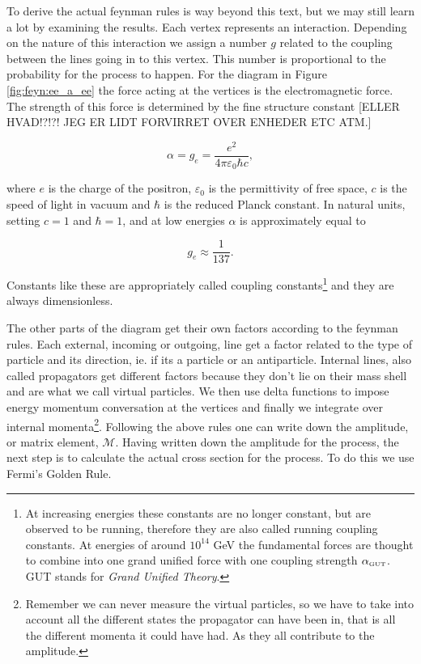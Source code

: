 To derive the actual feynman rules is way beyond this text, but we may still learn a lot by examining the results. Each vertex represents an interaction. Depending on the nature of this interaction we assign a number $g$ related to the coupling between the lines going in to this vertex. This number is proportional to the probability for the process to happen. For the diagram in Figure \ref{fig:feyn:ee_a_ee} the force acting at the vertices is the electromagnetic force. The strength of this force is determined by the fine structure constant [ELLER HVAD!?!?! JEG ER LIDT FORVIRRET OVER ENHEDER ETC ATM.]

\begin{equation}
	\alpha = g_e = \frac{e^2}{4\pi\varepsilon_0\hbar c},
\end{equation}

where $e$ is the charge of the positron, $\varepsilon_0$ is the permittivity of free space, $c$ is the speed of light in vacuum and $\hbar$ is the reduced Planck constant. In natural units, setting $c = 1$ and $\hbar = 1$, and at low energies $\alpha$ is approximately equal to

\begin{equation}
	 g_e \approx \frac{1}{137}.
\end{equation}

Constants like these are appropriately called coupling constants\footnote{At increasing energies these constants are no longer constant, but are observed to be running, therefore they are also called running coupling constants. At energies of around $10^{14}$ GeV the fundamental forces are thought to combine into one grand unified force with one coupling strength $\alpha_{\textrm{\tiny{GUT}}}$. GUT stands for \emph{Grand Unified Theory}.} and they are always dimensionless.

The other parts of the diagram get their own factors according to the feynman rules. Each external, incoming or outgoing, line get a factor related to the type of particle and its direction, ie. if its a particle or an antiparticle. Internal lines, also called propagators get different factors because they don't lie on their mass shell and are what we call virtual particles. We then use delta functions to impose energy momentum conversation at the vertices and finally we integrate over internal momenta\footnote{Remember we can never measure the virtual particles, so we have to take into account all the different states the propagator can have been in, that is all the different momenta it could have had. As they all contribute to the amplitude.}. Following the above rules one can write down the amplitude, or matrix element, $\mathcal{M}$. Having written down the amplitude for the process, the next step is to calculate the actual cross section for the process. To do this we use Fermi's Golden Rule.
% 
